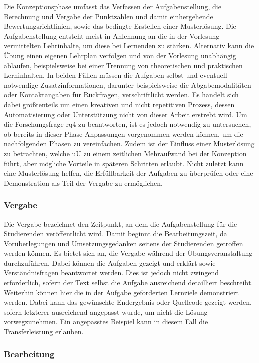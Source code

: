 Die Konzeptionsphase umfasst das Verfassen der Aufgabenstellung, die Berechnung und Vergabe der Punktzahlen und damit einhergehende Bewertungsrichtlinien, sowie das bedingte Erstellen einer Musterlösung.
Die Aufgabenstellung entsteht meist in Anlehnung an die in der Vorlesung vermittelten Lehrinhalte, um diese bei Lernenden zu stärken.
Alternativ kann die Übung einen eigenen Lehrplan verfolgen und von der Vorlesung unabhängig ablaufen, beispielsweise bei einer Trennung von theoretischen und praktischen Lerninhalten.
In beiden Fällen müssen die Aufgaben selbst und eventuell notwendige Zusatzinformationen, darunter beispielsweise die Abgabemodalitäten oder Kontaktangaben für Rückfragen, verschriftlicht werden.
Es handelt sich dabei größtenteils um einen kreativen und nicht repetitiven Prozess, dessen Automatisierung oder Unterstützung nicht von dieser Arbeit erstrebt wird.
Um die Forschungsfrage \acs{rq}4 zu beantworten, ist es jedoch notwendig zu untersuchen, ob bereits in dieser Phase Anpassungen vorgenommen werden können, um die nachfolgenden Phasen zu vereinfachen.
Zudem ist der Einfluss einer Musterlösung zu betrachten, welche \ac{uU} zu einem zeitlichen Mehraufwand bei der Konzeption führt, aber mögliche Vorteile in späteren Schritten erlaubt.
Nicht zuletzt kann eine Musterlösung helfen, die Erfüllbarkeit der Aufgaben zu überprüfen oder eine Demonstration als Teil der Vergabe zu ermöglichen.

\subsubsection{Vergabe}

Die Vergabe bezeichnet den Zeitpunkt, an dem die Aufgabenstellung für die Studierenden veröffentlicht wird.
Damit beginnt die Bearbeitungszeit, da Vorüberlegungen und Umsetzungsgedanken seitens der Studierenden getroffen werden können.
Es bietet sich an, die Vergabe während der Übungsveranstaltung durchzuführen.
Dabei können die Aufgaben gezeigt und erklärt sowie Verständnisfragen beantwortet werden.
Dies ist jedoch nicht zwingend erforderlich, sofern der Text selbst die Aufgabe ausreichend detailliert beschreibt.
Weiterhin können hier die in der Aufgabe geforderten Lernziele demonstriert werden.
Dabei kann das gewünschte Endergebnis oder Quellcode gezeigt werden, sofern letzterer ausreichend angepasst wurde, um nicht die Lösung vorwegzunehmen.
Ein angepasstes Beispiel kann in diesem Fall die Transferleistung erlauben.

\subsubsection{Bearbeitung}

